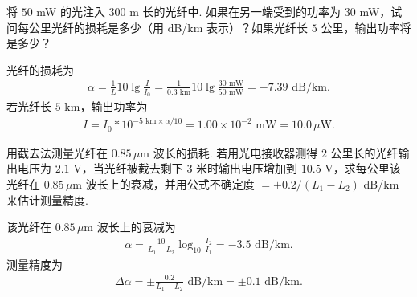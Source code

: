 \documentclass{assignment}
\begin{document}
\begin{prob}
    将 $50$ mW 的光注入 $300$ m 长的光纤中. 如果在另一端受到的功率为 $30$ mW，试问每公里光纤的损耗是多少（用 dB/km 表示）？如果光纤长 $5$ 公里，输出功率将是多少？
\end{prob}
\begin{sol}
    光纤的损耗为
    \begin{align}
        \alpha=\frac{1}{L}10\lg\frac{I}{I_0}=\frac{1}{0.3\text{ km}}10\lg\frac{30\text{ mW}}{50\text{ mW}}=-7.39\text{ dB/km}.
    \end{align}
    若光纤长 $5$ km，输出功率为
    \begin{align}
        I=I_0*10^{-5\text{ km}\times\alpha/10}=1.00\times 10^{-2}\text{ mW}=10.0\,\mu\text{W}.
    \end{align}
\end{sol}

\begin{prob}
    用截去法测量光纤在 $0.85\,\mu$m 波长的损耗. 若用光电接收器测得 $2$ 公里长的光纤输出电压为 $2.1$ V，当光纤被截去剩下 $3$ 米时输出电压增加到 $10.5$ V，求每公里该光纤在 $0.85\,\mu$m 波长上的衰减，并用公式不确定度 $=\pm 0.2/(L_1-L_2)$ dB/km 来估计测量精度.
\end{prob}
\begin{sol}
    该光纤在 $0.85\,\mu$m 波长上的衰减为
    \begin{align}
        \alpha=\frac{10}{L_1-L_2}\log_{10}\frac{I_2}{I_1}=-3.5\text{ dB/km}.
    \end{align}
    测量精度为
    \begin{align}
        \Delta\alpha=\pm\frac{0.2}{L_1-L_2}\text{ dB/km}=\pm0.1\text{ dB/km}.
    \end{align}
\end{sol}
\end{document}
